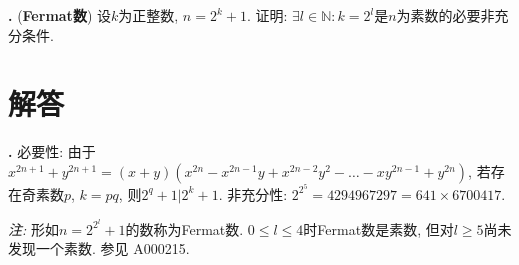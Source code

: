 \par \textbf{\theprobcong .} (\textbf{Fermat数}) 设$k$为正整数, $n=2^k+1$. 证明: $\exists l\in \mathbb{N}:k=2^l$是$n$为素数的必要非充分条件. 

\section*{解答}

\par \textbf{\thesolcong .} 必要性: 由于$x^{2n+1}+y^{2n+1}=(x+y)(x^{2n}-x^{2n-1}y+x^{2n-2}y^2-\dots-xy^{2n-1} +y^{2n})$, 若存在奇素数$p$, $k=pq$, 则$2^q+1\vert 2^k+1$. 非充分性: $2^{2^5}=4294967297=641\times 6700417$.
\par \emph{注:} 形如$n=2^{2^l}+1$的数称为Fermat数. $0\le l\le 4$时Fermat数是素数, 但对$l\ge 5$尚未发现一个素数. 参见\cite{OEIS} A000215. 